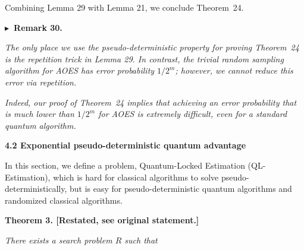 Combining Lemma 29 with Lemma 21, we conclude Theorem 24.\par





\par\medskip\noindent\textbf{
$\blacktriangleright$ Remark 30.
}\par



\emph{The only place we use the pseudo-deterministic property for proving Theorem 24 is the repetition trick in Lemma 29. In contrast, the trivial random sampling algorithm for AOES has error probability $1/2^{m}$; however, we cannot reduce this error via repetition.}\par




\emph{Indeed, our proof of Theorem 24 implies that achieving an error probability that is much lower than $1/{2^{m}}$ for AOES is extremely difficult, even for a standard quantum algorithm.}\par









\par\medskip\noindent\textbf{
4.2 Exponential pseudo-deterministic quantum advantage}\par




In this section, we define a problem, Quantum-Locked Estimation (QL-Estimation), which is hard for classical algorithms to solve pseudo-deterministically, but is easy for pseudo-deterministic quantum algorithms and randomized classical algorithms.\par






\par\medskip\noindent\textbf{
\textbf{Theorem 3}\textbf{.}
[Restated, see original statement.]}\par



\emph{There exists a search problem ${R}$ such that}\par


